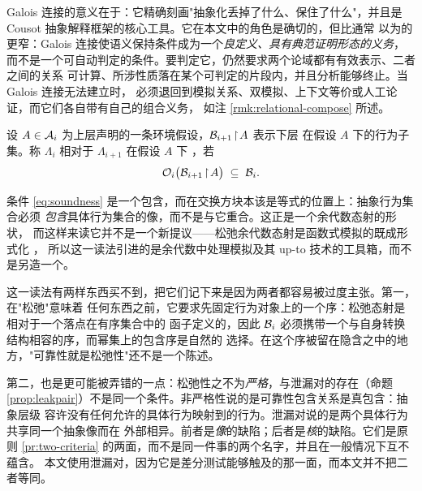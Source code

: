 Galois 连接的意义在于：它精确刻画"抽象化丢掉了什么、保住了什么"，并且是
Cousot 抽象解释框架的核心工具\cite{cousot1977}。它在本文中的角色是确切的，但比通常
以为的更窄：Galois 连接使语义保持条件成为一个\emph{良定义、具有典范证明形态的义务}，
而不是一个可自动判定的条件。要判定它，仍然要求两个论域都有有效表示、二者之间的关系
可计算、所涉性质落在某个可判定的片段内，并且分析能够终止。当 Galois 连接无法建立时，
必须退回到模拟关系、双模拟、上下文等价或人工论证，而它们各自带有自己的组合义务，
如注 \ref{rmk:relational-compose} 所述。

\begin{definition}[层间可靠性]\label{def:soundness}
设 $A \in \mathcal{A}_i$ 为上层声明的一条环境假设，$\mathcal{B}_{i+1}\!\upharpoonright\! A$ 表示下层
在假设 $A$ 下的行为子集。称 $\Lambda_i$ 相对于 $\Lambda_{i+1}$ 在假设 $A$ 下
，若
\begin{equation}\label{eq:soundness}
\mathcal{O}_i\bigl(\mathcal{B}_{i+1}\!\upharpoonright\! A\bigr) \;\subseteq\; \mathcal{B}_i .
\end{equation}
\end{definition}

\begin{remark}\label{rmk:lax}
条件 \eqref{eq:soundness} 是一个包含，而在交换方块本该是等式的位置上：抽象行为集合必须
\emph{包含}具体行为集合的像，而不是与它重合。这正是一个余代数态射的形状，
而这样来读它并不是一个新提议——松弛余代数态射是函数式模拟的既成形式化 \cite{rot2023}，
所以这一读法引进的是余代数中处理模拟及其 up-to 技术的工具箱，而不是另造一个。

这一读法有两样东西买不到，把它们记下来是因为两者都容易被过度主张。第一，在"松弛"意味着
任何东西之前，它要求先固定行为对象上的一个序：松弛态射是相对于一个落点在有序集合中的
函子定义的，因此 $\mathcal{B}_i$ 必须携带一个与自身转换结构相容的序，而幂集上的包含序是自然的
选择。在这个序被留在隐含之中的地方，"可靠性就是松弛性"还不是一个陈述。

第二，也是更可能被弄错的一点：松弛性之不为\emph{严格}，与泄漏对的存在（命题
\ref{prop:leakpair}）不是同一个条件。非严格性说的是可靠性包含关系是真包含：抽象层级
容许没有任何允许的具体行为映射到的行为。泄漏对说的是两个具体行为共享同一个抽象像而在
外部相异。前者是\emph{像}的缺陷；后者是\emph{核}的缺陷。它们是原则
\ref{pr:two-criteria} 的两面，而不是同一件事的两个名字，并且在一般情况下互不蕴含。
本文使用泄漏对，因为它是差分测试能够触及的那一面，而本文并不把二者等同。
\end{remark}

